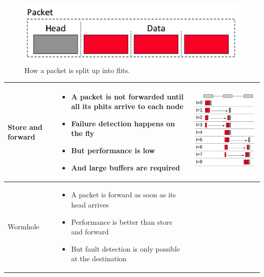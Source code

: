 \begin{figure}
  \centering
  \includegraphics[width=0.5\linewidth]{images/flits}
  \caption{How a packet is split up into flits.}
  \label{flits}
\end{figure}

\begin{center}
  \begin{tabular}{| m{2cm} | m{5cm} | c |}
    \hline
    Store and forward &
    \begin{itemize}
      \item A packet is not forwarded until all its phits arrive to each node
      \item Failure detection happens on the fly
      \item But performance is low
      \item And large buffers are required
    \end{itemize} & 
    \begin{minipage}{.3\textwidth}
      \begin{center}
        \includegraphics[width=0.5\linewidth]{images/store-and-forward}
      \end{center}
    \end{minipage} \\ \hline
    Wormhole &
    \begin{itemize}
      \item A packet is forward as soon as its head arrives
      \item Performance is better than store and forward
      \item But fault detection is only possible at the destination

\end{itemize}
\end{tabular}
\end{center}

